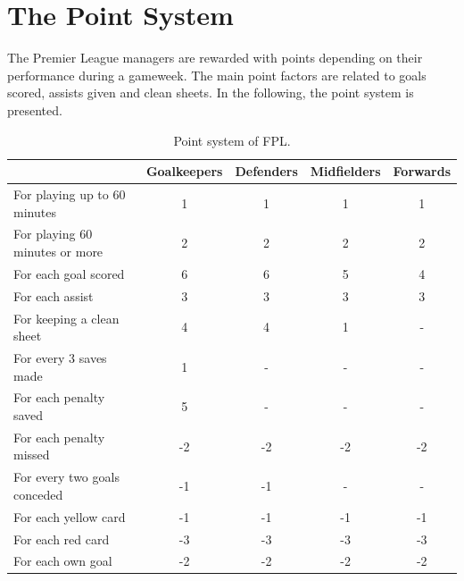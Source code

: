 \section{The Point System} \label{point_system}

The Premier League managers are rewarded with points depending on their performance during a gameweek. The main point factors are related to goals scored, assists given and clean sheets. In the following, the point system is presented. 

\begin{table}[H]
\centering
\small
\begin{tabular}{|l|c|c|c|c|}
\hline
                               & Goalkeepers & Defenders & Midfielders & Forwards \\
\hline
For playing up to 60 minutes   & 1           & 1         & 1           & 1        \\
For playing 60 minutes or more & 2           & 2         & 2           & 2        \\
For each goal scored           & 6           & 6         & 5           & 4        \\
For each assist                & 3           & 3         & 3           & 3        \\
For keeping a clean sheet      & 4           & 4         & 1           & -        \\
For every 3 saves made         & 1           & -         & -           & -        \\
For each penalty saved         & 5           & -         & -           & -        \\
For each penalty missed        & -2          & -2        & -2          & -2       \\
For every two goals conceded   & -1          & -1        & -           & -        \\
For each yellow card           & -1          & -1        & -1          & -1       \\
For each red card              & -3          & -3        & -3          & -3       \\
For each own goal              & -2          & -2        & -2          & -2      \\
\hline
\end{tabular}
\caption{Point system of FPL.}
\end{table}

